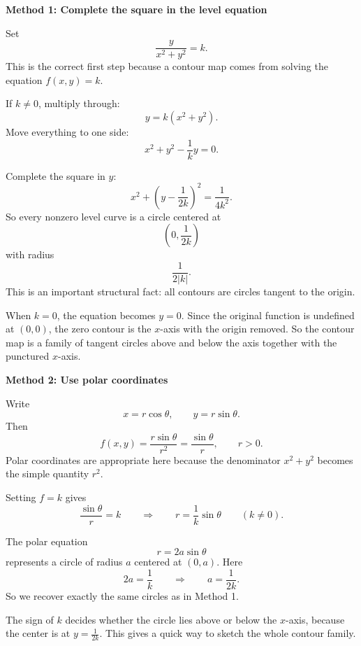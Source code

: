 \documentclass[a4paper,12pt,twocolumn]{article}
\newenvironment{solutionbox}{\begin{framed}}{\end{framed}}
\begin{document}
\begin{solutionbox}
\textbf{Method 1: Complete the square in the level equation}

\begin{steps}
\item Set
\[
\frac{y}{x^2+y^2}=k.
\]
This is the correct first step because a contour map comes from solving the equation \(f(x,y)=k\).

\item If \(k\ne 0\), multiply through:
\[
y=k(x^2+y^2).
\]
Move everything to one side:
\[
x^2+y^2-\frac{1}{k}y=0.
\]

\item Complete the square in \(y\):
\[
x^2+\left(y-\frac{1}{2k}\right)^2=\frac{1}{4k^2}.
\]
So every nonzero level curve is a circle centered at
\[
\left(0,\frac{1}{2k}\right)
\]
with radius
\[
\frac{1}{2|k|}.
\]
This is an important structural fact: all contours are circles tangent to the origin.

\item When \(k=0\), the equation becomes \(y=0\). Since the original function is undefined at \((0,0)\), the zero contour is the \(x\)-axis with the origin removed. So the contour map is a family of tangent circles above and below the axis together with the punctured \(x\)-axis.
\end{steps}
\end{solutionbox}

\begin{solutionbox}
\textbf{Method 2: Use polar coordinates}

\begin{steps}
\item Write
\[
x=r\cos\theta,\qquad y=r\sin\theta.
\]
Then
\[
f(x,y)=\frac{r\sin\theta}{r^2}=\frac{\sin\theta}{r},
\qquad r>0.
\]
Polar coordinates are appropriate here because the denominator \(x^2+y^2\) becomes the simple quantity \(r^2\).

\item Setting \(f=k\) gives
\[
\frac{\sin\theta}{r}=k
\qquad\Longrightarrow\qquad
r=\frac{1}{k}\sin\theta
\qquad (k\ne 0).
\]

\item The polar equation
\[
r=2a\sin\theta
\]
represents a circle of radius \(a\) centered at \((0,a)\). Here
\[
2a=\frac{1}{k}
\qquad\Longrightarrow\qquad
a=\frac{1}{2k}.
\]
So we recover exactly the same circles as in Method 1.

\item The sign of \(k\) decides whether the circle lies above or below the \(x\)-axis, because the center is at \(y=\frac{1}{2k}\). This gives a quick way to sketch the whole contour family.
\end{steps}
\end{solutionbox}
\end{document}
